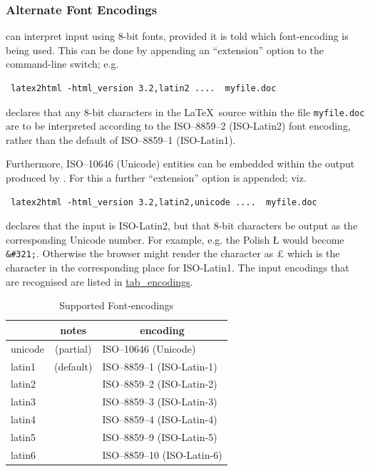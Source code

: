 \subsubsection{Alternate Font Encodings\label{fontEncodings}}%
%
%
\html{\\}%
\latextohtml{} can interpret input using 8-bit fonts, 
provided it is told which font-encoding is being used.
This can be done by appending an ``extension'' option
to the  command-line switch; e.g.
%
\begin{small}
\begin{verbatim}
 latex2html -html_version 3.2,latin2 ....  myfile.doc
\end{verbatim}
\end{small}
declares that any 8-bit characters in the \LaTeX\ source
within the file \texttt{myfile.doc} are to be interpreted
according to the ISO--8859--2 (ISO-Latin2) font encoding,
rather than the default of ISO--8859--1 (ISO-Latin1).

Furthermore, ISO--10646 (Unicode) entities can be embedded within
the output produced by \latextohtml.
For this a further ``extension'' option is appended; viz.
%
\begin{small}
\begin{verbatim}
 latex2html -html_version 3.2,latin2,unicode ....  myfile.doc
\end{verbatim}
\end{small}
declares that the input is ISO-Latin2, but that 8-bit characters
be output as the corresponding Unicode number.
For example, e.g. the Polish {\L} would become \texttt{\&\#321;}.
Otherwise the browser might render the character as \pounds %
which is the character in the corresponding place for ISO-Latin1.
The input encodings that are recognised are listed in 
\hyperref{the following table}{Table~}{}{tab_encodings}.

\begin{table}
\begin{center}
\begin{tabular}{|>{\ttfamily}lcl|}%
\multicolumn{1}{c}{\textbf{extension}}
&\multicolumn{1}{c}{\textbf{notes}}
&\multicolumn{1}{c}{\textbf{encoding}}\\\hline
unicode & (partial)& ISO--10646 (Unicode)\\
latin1 & (default) & ISO--8859--1 (ISO-Latin-1) \\
latin2 &  & ISO--8859--2 (ISO-Latin-2) \\
latin3 &  & ISO--8859--3 (ISO-Latin-3) \\
latin4 &  & ISO--8859--4 (ISO-Latin-4) \\
latin5 &  & ISO--8859--9 (ISO-Latin-5) \\
latin6 &  & ISO--8859--10 (ISO-Latin-6)\\\hline
\end{tabular}
\caption{Supported Font-encodings\label{tab_encodings}}
\end{center}
\end{table}


